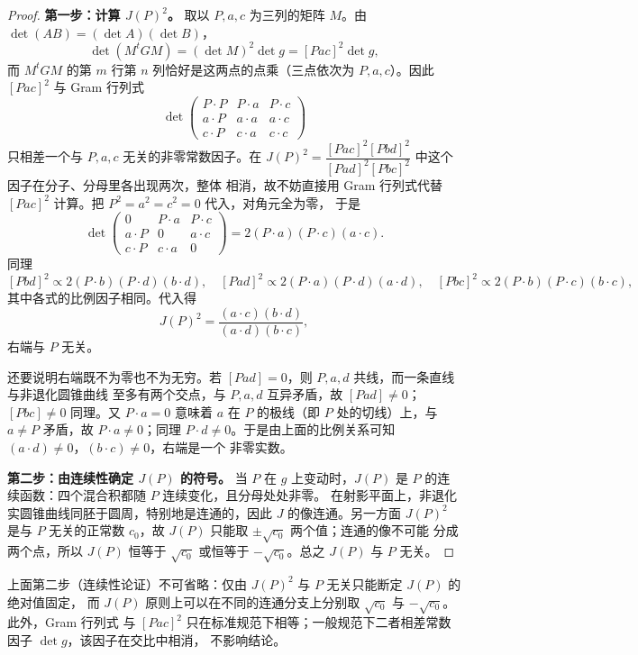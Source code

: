 \begin{proof}
\textbf{第一步：计算 $J(P)^2$。}
取以 $P,a,c$ 为三列的矩阵 $M$。由 $\det(AB)=(\det A)(\det B)$，
\[
\det(M^{t}GM)=(\det M)^2\det g=[Pac]^2\det g,
\]
而 $M^{t}GM$ 的第 $m$ 行第 $n$ 列恰好是这两点的点乘（三点依次为 $P,a,c$）。因此 $[Pac]^2$
与 Gram 行列式
\[
\det\begin{pmatrix}
P\cdot P & P\cdot a & P\cdot c\\
a\cdot P & a\cdot a & a\cdot c\\
c\cdot P & c\cdot a & c\cdot c
\end{pmatrix}
\]
只相差一个与 $P,a,c$ 无关的非零常数因子。在
$J(P)^2=\dfrac{[Pac]^2[Pbd]^2}{[Pad]^2[Pbc]^2}$ 中这个因子在分子、分母里各出现两次，整体
相消，故不妨直接用 Gram 行列式代替 $[Pac]^2$ 计算。把 $P^2=a^2=c^2=0$ 代入，对角元全为零，
于是
\[
\det\begin{pmatrix}
0 & P\cdot a & P\cdot c\\
a\cdot P & 0 & a\cdot c\\
c\cdot P & c\cdot a & 0
\end{pmatrix}
=2(P\cdot a)(P\cdot c)(a\cdot c).
\]
同理
\[
[Pbd]^2\propto2(P\cdot b)(P\cdot d)(b\cdot d),\quad
[Pad]^2\propto2(P\cdot a)(P\cdot d)(a\cdot d),\quad
[Pbc]^2\propto2(P\cdot b)(P\cdot c)(b\cdot c),
\]
其中各式的比例因子相同。代入得
\[
J(P)^2=\frac{(a\cdot c)(b\cdot d)}{(a\cdot d)(b\cdot c)},
\]
右端与 $P$ 无关。

还要说明右端既不为零也不为无穷。若 $[Pad]=0$，则 $P,a,d$ 共线，而一条直线与非退化圆锥曲线
至多有两个交点，与 $P,a,d$ 互异矛盾，故 $[Pad]\neq0$；$[Pbc]\neq0$ 同理。又 $P\cdot a=0$
意味着 $a$ 在 $P$ 的极线（即 $P$ 处的切线）上，与 $a\neq P$ 矛盾，故 $P\cdot a\neq0$；同理
$P\cdot d\neq0$。于是由上面的比例关系可知 $(a\cdot d)\neq0$，$(b\cdot c)\neq0$，右端是一个
非零实数。

\textbf{第二步：由连续性确定 $J(P)$ 的符号。}
当 $P$ 在 $g$ 上变动时，$J(P)$ 是 $P$ 的连续函数：四个混合积都随 $P$ 连续变化，且分母处处非零。
在射影平面上，非退化实圆锥曲线同胚于圆周，特别地是连通的，因此 $J$ 的像连通。另一方面
$J(P)^2$ 是与 $P$ 无关的正常数 $c_0$，故 $J(P)$ 只能取 $\pm\sqrt{c_0}$ 两个值；连通的像不可能
分成两个点，所以 $J(P)$ 恒等于 $\sqrt{c_0}$ 或恒等于 $-\sqrt{c_0}$。总之 $J(P)$ 与 $P$ 无关。
\end{proof}

\begin{remark}
上面第二步（连续性论证）不可省略：仅由 $J(P)^2$ 与 $P$ 无关只能断定 $J(P)$ 的绝对值固定，
而 $J(P)$ 原则上可以在不同的连通分支上分别取 $\sqrt{c_0}$ 与 $-\sqrt{c_0}$。此外，Gram 行列式
与 $[Pac]^2$ 只在标准规范下相等；一般规范下二者相差常数因子 $\det g$，该因子在交比中相消，
不影响结论。
\end{remark}

